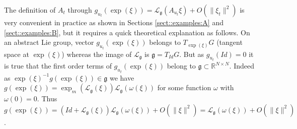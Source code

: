 \documentclass[a4paper,12pt,onecolumn]{article}
\newcommand{\RR}{{\mathbb{R}}}
\newcommand{\norm}[1]{\lVert#1\rVert}
\begin{document}
The definition of $A_t$ through  $g_{u_t}(\exp(\xi)) = \mathcal{L}_{\mathfrak{g}}(A_{u_t} \xi) + O(\norm{\xi_t}^2)$ is very convenient in practice as shown in Sections \ref{sect::examples:A} and \ref{sect::examples:B}, but it requires a quick theoretical explanation  as follows. 
On an abstract Lie group, vector $g_{u_t} \left( \exp\left( \xi \right) \right)$ belongs to $T_{\exp \left( \xi \right)} G$ (tangent space at $\exp \left( \xi \right)$) whereas the image of $\mathcal{L}_{\mathfrak{g}}$ is $\mathfrak{g}=T_{Id}G$. But as $g_{u_t} \left( Id \right)=0$ it is true that the first order terms of $g_{u_t} \left( \exp\left( \xi \right) \right)$  belong to $\mathfrak g\subset\RR^{N\times N}$. Indeed as $\exp\left( \xi \right)^{-1}g  \left( \exp\left( \xi \right) \right)\in\mathfrak g$ we have $g  \left( \exp\left( \xi \right) \right)=\exp_m(\mathcal{L}_{\mathfrak{g}}(\xi))\mathcal{L}_{\mathfrak{g}}(\omega(\xi))$ for some function $\omega$ with $\omega(0) =0$. Thus $g  \left( \exp\left( \xi \right) \right)=(Id+\mathcal{L}_{\mathfrak{g}}(\xi))\mathcal{L}_{\mathfrak{g}}(\omega(\xi))+O(\norm{\xi}^2)=\mathcal{L}_{\mathfrak{g}}(\omega(\xi))+O(\norm{\xi}^2)$.
\end{document}
